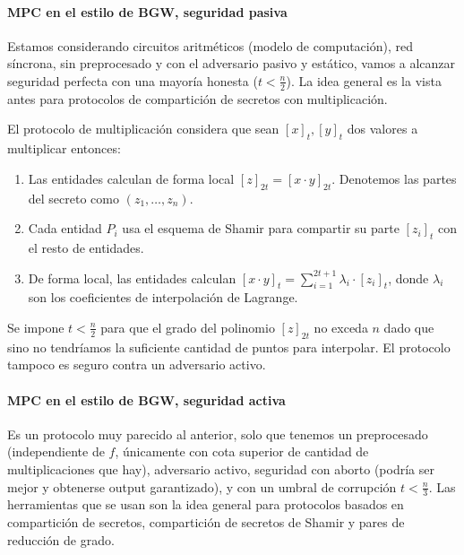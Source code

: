   \paragraph{MPC en el estilo de BGW, seguridad pasiva}
  Estamos considerando circuitos aritméticos (modelo de computación), red síncrona, sin preprocesado y con el
  adversario pasivo y estático, vamos a alcanzar seguridad perfecta con una mayoría honesta ($t < \frac{n}{2}$).
  La idea general es la vista antes para protocolos de compartición de secretos con multiplicación.

  El protocolo de multiplicación considera que sean $[x]_t,[y]_t$ dos valores a multiplicar entonces:
  \begin{enumerate}
    \item Las entidades calculan de forma local $[z]_{2t} = [x \cdot y]_{2t}$.
      Denotemos las partes del secreto como $(z_1,\dots,z_n)$.
    \item Cada entidad $P_i$ usa el esquema de Shamir para compartir su parte $[z_i]_t$ con el resto de entidades.
    \item De forma local, las entidades calculan $[x\cdot y]_t = \sum_{i=1}^{2t+1} \lambda_i \cdot [z_i]_t$,
      donde $\lambda_i$ son los coeficientes de interpolación de Lagrange.
  \end{enumerate}
  \begin{remark}
    Se impone $t < \frac{n}{2}$ para que el grado del polinomio $[z]_{2t}$ no exceda $n$ dado que sino no tendríamos 
    la suficiente cantidad de puntos para interpolar.
    El protocolo tampoco es seguro contra un adversario activo.
  \end{remark}

  \paragraph{MPC en el estilo de BGW, seguridad activa}
  Es un protocolo muy parecido al anterior, solo que tenemos un preprocesado (independiente de $f$, únicamente con
  cota superior de cantidad de multiplicaciones que hay), adversario activo, seguridad con aborto (podría ser mejor y
  obtenerse output garantizado), y con un umbral de corrupción $t < \frac{n}{3}$.
  Las herramientas que se usan son la idea general para protocolos basados en compartición de secretos, compartición de 
  secretos de Shamir y pares de reducción de grado.

